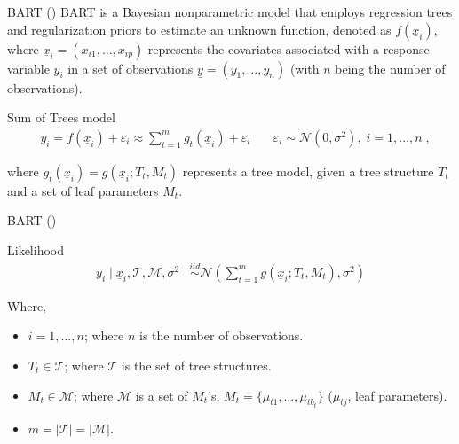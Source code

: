 \documentclass[10pt]{beamer}
\begin{document}
\begin{frame}{BART (\cite{Chipman_2010})}
    BART is a Bayesian nonparametric model that employs regression trees and regularization priors to estimate an unknown function, denoted as $f(\underline{x}_i)$, where $\underline{x}_i = (x_{i1}, \dots, x_{ip})$ represents the covariates associated with a response variable $y_i$ in a set of observations $\underline{y} = (y_1, \dots, y_n)$ (with $n$ being the number of observations).

    \begin{block}{Sum of Trees model}
        \begin{align}
            & y_i = f(\underline{x}_i) + \varepsilon_i \approx \sum_{t=1}^m g_t(\underline{x}_i) + \varepsilon_i & \quad \varepsilon_i \sim \mathcal{N}(0, \sigma^2), \; i = 1, \dots, n \; ,
        \end{align}
    \end{block}

    where $g_t(\underline{x}_i) = g(\underline{x}_i; T_t, M_t)$ represents a tree model, given a tree structure $T_t$ and a set of leaf parameters $M_t$.  
\end{frame}

\begin{frame}{BART (\cite{Chipman_2010})}
    \begin{block}{Likelihood}
        \begin{align}
            y_i \mid \underline{x}_i, \mathcal{T}, \mathcal{M}, \sigma^2 &\stackrel{iid}{\sim} \mathcal{N}\left(\sum_{t=1}^mg\left(\underline{x}_i;  T_t, M_t\right), \sigma^2\right)  
        \end{align}
    \end{block}

    Where,
    \begin{itemize}
        \item $i = 1,...,n$; where $n$ is the number of observations.
        \item $T_t \in \mathcal{T}$; where $\mathcal{T}$ is the set of tree structures.
        \item $M_t \in \mathcal{M}$; where $\mathcal{M}$ is a set of $M_t$'s, $M_t = \{\mu_{t1}, \dots , \mu_{tb_t}\}$ ($\mu_{tj}$, leaf parameters).
        \item $m = |\mathcal{T}| = |\mathcal{M}|$.
    \end{itemize}
\end{frame}
\end{document}
